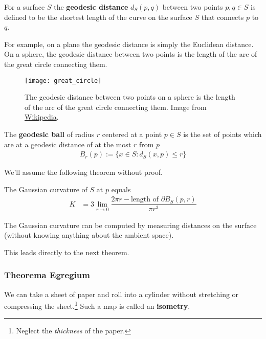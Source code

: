   \begin{definition}
    For a surface $S$ the \textbf{geodesic distance} $d_S(p,q)$ between two points $p,q \in S$ is defined to be the shortest length of the curve on the surface $S$ that connects $p$ to $q$.
  \end{definition} For example, on a plane the geodesic distance is simply the Euclidean distance. On a sphere, the geodesic distance between two points is the length of the arc of the great circle connecting them.
  \begin{figure}[H]
    \centering
      \texttt{[image: great\_circle]}
    \caption{The geodesic distance between two points on a sphere is the length of the arc of the great circle connecting them. Image from \href{https://en.wikipedia.org/wiki/Great-circle_distance}{Wikipedia}.}
  \end{figure}

  \begin{definition}
    The \textbf{geodesic ball} of radius $r$ centered at a point $p \in S$ is the set of points which are at a geodesic distance of at the most $r$ from $p$
    \begin{align*}
      B_r(p) := \{ x \in S : d_S(x,p) \le r\}
    \end{align*}
  \end{definition}
We'll assume the following theorem without proof.
  \begin{thm}
    The Gaussian curvature of $S$ at $p$ equals
    \begin{align*}
      K &= 3 \lim \limits_{r \rightarrow 0} \dfrac{2 \pi r - \mbox{length of } \partial B_S(p,r) }{\pi r^3}
    \end{align*}
  \end{thm}
\begin{cor}
  \label{thm:geodesics}
  The Gaussian curvature can be computed by measuring distances on the surface (without knowing anything about the ambient space).
\end{cor}
This leads directly to the next theorem.

  \subsubsection{Theorema Egregium}
  We can take a sheet of paper and roll into a cylinder without stretching or compressing the sheet.\footnote{Neglect the \emph{thickness} of the paper.} Such a map is called an \textbf{isometry}.



